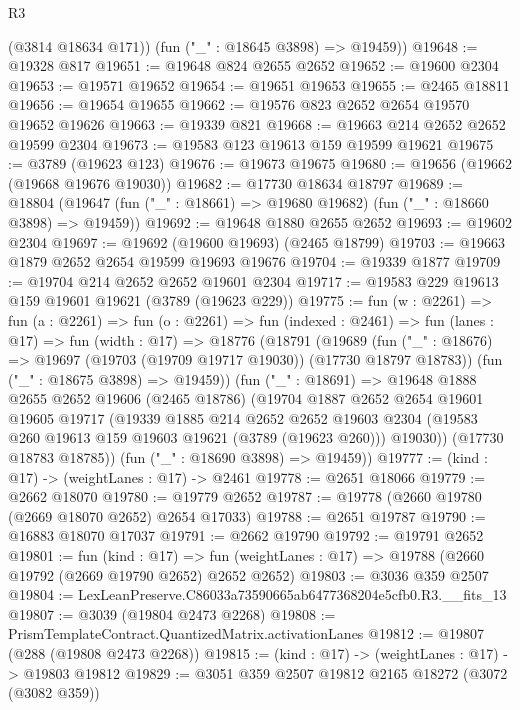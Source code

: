 \begin{lexlean}{R3}
\begin{coremodule}
        (@3814 @18634 @171))
      (fun ("_" : @18645 @3898) => @19459))
@19648 := @19328 @817
@19651 := @19648 @824 @2655 @2652
@19652 := @19600 @2304
@19653 := @19571 @19652
@19654 := @19651 @19653
@19655 := @2465 @18811
@19656 := @19654 @19655
@19662 := @19576 @823 @2652 @2654 @19570 @19652 @19626
@19663 := @19339 @821
@19668 := @19663 @214 @2652 @2652 @19599 @2304
@19673 := @19583 @123 @19613 @159 @19599 @19621
@19675 := @3789 (@19623 @123)
@19676 := @19673 @19675
@19680 := @19656 (@19662 (@19668 @19676 @19030))
@19682 := @17730 @18634 @18797
@19689 := @18804 (@19647 (fun ("_" : @18661) => @19680 @19682) (fun ("_" : @18660 @3898) => @19459))
@19692 := @19648 @1880 @2655 @2652
@19693 := @19602 @2304
@19697 := @19692 (@19600 @19693) (@2465 @18799)
@19703 := @19663 @1879 @2652 @2654 @19599 @19693 @19676
@19704 := @19339 @1877
@19709 := @19704 @214 @2652 @2652 @19601 @2304
@19717 := @19583 @229 @19613 @159 @19601 @19621 (@3789 (@19623 @229))
@19775 := fun (w : @2261) =>
  fun (a : @2261) =>
  fun (o : @2261) =>
  fun (indexed : @2461) =>
  fun (lanes : @17) =>
  fun (width : @17) =>
  @18776
    (@18791
      (@19689
        (fun ("_" : @18676) => @19697 (@19703 (@19709 @19717 @19030)) (@17730 @18797 @18783))
        (fun ("_" : @18675 @3898) => @19459))
      (fun ("_" : @18691) =>
      @19648
        @1888
        @2655
        @2652
        @19606
        (@2465 @18786)
        (@19704
          @1887
          @2652
          @2654
          @19601
          @19605
          @19717
          (@19339
            @1885
            @214
            @2652
            @2652
            @19603
            @2304
            (@19583 @260 @19613 @159 @19603 @19621 (@3789 (@19623 @260)))
            @19030))
        (@17730 @18783 @18785))
      (fun ("_" : @18690 @3898) => @19459))
@19777 := (kind : @17) -> (weightLanes : @17) -> @2461
@19778 := @2651 @18066
@19779 := @2662 @18070
@19780 := @19779 @2652
@19787 := @19778 (@2660 @19780 (@2669 @18070 @2652) @2654 @17033)
@19788 := @2651 @19787
@19790 := @16883 @18070 @17037
@19791 := @2662 @19790
@19792 := @19791 @2652
@19801 := fun (kind : @17) =>
  fun (weightLanes : @17) => @19788 (@2660 @19792 (@2669 @19790 @2652) @2652 @2652)
@19803 := @3036 @359 @2507
@19804 := LexLeanPreserve.C86033a73590665ab6477368204e5cfb0.R3.__fits_13
@19807 := @3039 (@19804 @2473 @2268)
@19808 := PrismTemplateContract.QuantizedMatrix.activationLanes
@19812 := @19807 (@288 (@19808 @2473 @2268))
@19815 := (kind : @17) -> (weightLanes : @17) -> @19803 @19812
@19829 := @3051
    @359
    @2507
    @19812
    @2165
    @18272
    (@3072 (@3082 @359))

\end{coremodule}
\end{lexlean}
